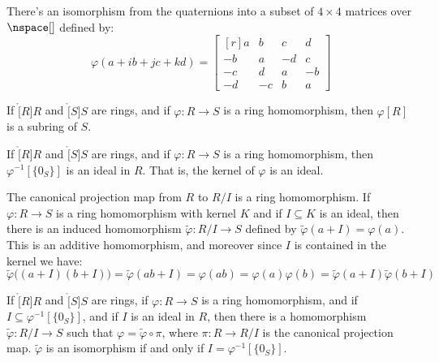 \documentclass{book}                                                           %
\begin{document}
            \begin{example}
                There's an isomorphism from the quaternions into a subset of
                $4\times{4}$ matrices over $\nspace[]$ defined by:
                \begin{equation}
                    \varphi(a+ib+jc+kd)=
                    \begin{bmatrix*}[r]
                        a&b&c&d\\
                        \minus{b}&a&\minus{d}&c\\
                        \minus{c}&d&a&\minus{b}\\
                        \minus{d}&\minus{c}&b&a
                    \end{bmatrix*}
                \end{equation}
            \end{example}
            \begin{theorem}
                If $\ring[R]{R}$ and $\ring[S]{S}$ are rings, and if
                $\varphi:R\rightarrow{S}$ is a ring homomorphism, then
                $\varphi[R]$ is a subring of $S$.
            \end{theorem}
            \begin{theorem}
                If $\ring[R]{R}$ and $\ring[S]{S}$ are rings, and if
                $\varphi:R\rightarrow{S}$ is a ring homomorphism, then
                $\varphi^{\minus{1}}[\{0_{S}\}]$ is an ideal in $R$. That
                is, the kernel of $\varphi$ is an ideal.
            \end{theorem}
            The canonical projection map from $R$ to $R/I$ is a ring
            homomorphism. If $\varphi:R\rightarrow{S}$ is a ring
            homomorphism with kernel $K$ and if $I\subseteq{K}$ is an ideal,
            then there is an induced homomorphism
            $\tilde{\varphi}:R/I\rightarrow{S}$ defined by
            $\tilde{\varphi}(a+I)=\varphi(a)$. This is an additive
            homomorphism, and moreover since $I$ is contained in the kernel
            we have:
            \begin{equation}
                \tilde{\varphi}\big((a+I)(b+I)\big)=\tilde{\varphi}(ab+I)
                =\varphi(ab)=\varphi(a)\varphi(b)
                =\tilde{\varphi}(a+I)\tilde{\varphi}(b+I)
            \end{equation}
            \begin{theorem}
                If $\ring[R]{R}$ and $\ring[S]{S}$ are rings, if
                $\varphi:R\rightarrow{S}$ is a ring homomorphism, and if
                $I\subseteq\varphi^{\minus{1}}[\{0_{S}\}]$, and if $I$ is an
                ideal in $R$, then there is a homomorphism
                $\tilde{\varphi}:R/I\rightarrow{S}$ such that
                $\varphi=\tilde{\varphi}\circ\pi$, where
                $\pi:R\rightarrow{R}/I$ is the canonical projection map.
                $\tilde{\varphi}$ is an isomorphism if and only if
                $I=\varphi^{\minus{1}}[\{0_{S}\}]$.
            \end{theorem}
\end{document}
